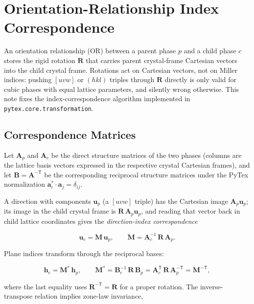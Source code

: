 \section{Orientation-Relationship Index Correspondence}

An orientation relationship (OR) between a parent phase $p$ and a child phase $c$ stores the
rigid rotation $\mathbf{R}$ that carries parent crystal-frame Cartesian vectors into the child
crystal frame. Rotations act on Cartesian vectors, not on Miller indices: pushing $[uvw]$ or
$(hkl)$ triples through $\mathbf{R}$ directly is only valid for cubic phases with equal lattice
parameters, and silently wrong otherwise. This note fixes the index-correspondence algorithm
implemented in \texttt{pytex.core.transformation}.

\subsection{Correspondence Matrices}

Let $\mathbf{A}_{p}$ and $\mathbf{A}_{c}$ be the direct structure matrices of the two phases
(columns are the lattice basis vectors expressed in the respective crystal Cartesian frames), and
let $\mathbf{B} = \mathbf{A}^{-\mathsf{T}}$ be the corresponding reciprocal structure matrices
under the PyTex normalization $\mathbf{a}^{*}_{i} \cdot \mathbf{a}_{j} = \delta_{ij}$.

A direction with components $\mathbf{u}_{p}$ (a $[uvw]$ triple) has the Cartesian image
$\mathbf{A}_{p}\mathbf{u}_{p}$; its image in the child crystal frame is
$\mathbf{R}\,\mathbf{A}_{p}\mathbf{u}_{p}$, and reading that vector back in child lattice
coordinates gives the \emph{direction-index correspondence}

\begin{equation}
\mathbf{u}_{c} = \mathbf{M}\,\mathbf{u}_{p},
\qquad
\mathbf{M} = \mathbf{A}_{c}^{-1}\,\mathbf{R}\,\mathbf{A}_{p}.
\end{equation}

Plane indices transform through the reciprocal bases:

\begin{equation}
\mathbf{h}_{c} = \mathbf{M}^{*}\,\mathbf{h}_{p},
\qquad
\mathbf{M}^{*} = \mathbf{B}_{c}^{-1}\,\mathbf{R}\,\mathbf{B}_{p}
= \mathbf{A}_{c}^{\mathsf{T}}\,\mathbf{R}\,\mathbf{A}_{p}^{-\mathsf{T}}
= \mathbf{M}^{-\mathsf{T}},
\end{equation}

where the last equality uses $\mathbf{R}^{-\mathsf{T}} = \mathbf{R}$ for a proper rotation. The
inverse-transpose relation implies zone-law invariance,

